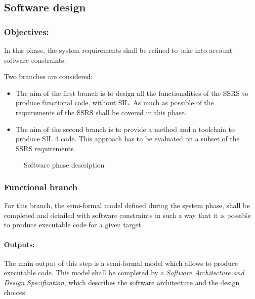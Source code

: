 
\subsection{Software design}
\label{sec:sw-design}

\subsubsection{Objectives:}
\label{sec:sw-req-objective}


In this phase, the system requirements shall be refined to take into account software constraints.

Two branches are considered:
\begin{itemize}
\item  The aim of the first branch  is to  design all the functionalities of the SSRS to  produce functional code, without SIL. As much as possible of the requirements of the SSRS shall be covered in this phase.
\item The aim  of the second branch is to provide a method and a toolchain to produce SIL 4 code. This approach has to be evaluated on a subset of the SSRS requirements.
\end{itemize}


\begin{figure}[h]
  \centering
  \caption{Software phase description}
  \label{fig:detailed software}
\end{figure}


\subsubsection{Functional branch}
\label{sec:sw-func}

For this branch, the semi-formal model  defined during the system phase, shall  be completed and detailed with software constraints in such a way that it is possible to produce executable code for a given target.


\paragraph{Outputs:}
\label{sec:sw-func_out}

The main output of this step  is a semi-formal model which  allows to produce executable code.
This model  shall be completed by a \textit{Software Architecture and Design Specification}, which describes the software architecture and the design choices.


